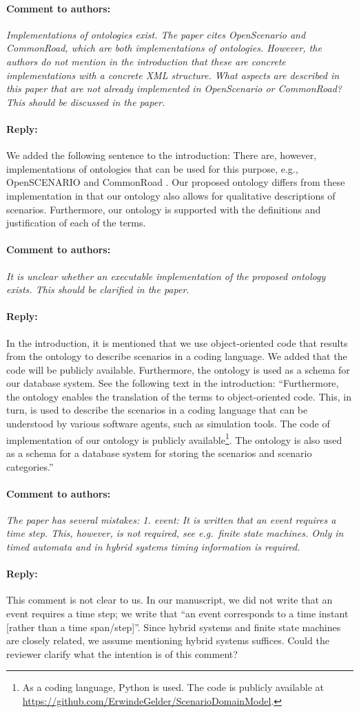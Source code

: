 \documentclass[10pt,final,a4paper,oneside,onecolumn]{article}
\renewcommand{\cite}[1]{\parencite{#1}}
\newcommand{\toauthor}{\paragraph*{Comment to authors:} \itshape}
\newcommand{\fromauthor}{\paragraph*{Reply:} \normalfont}
\newcommand{\cstart}{\cbstart\color{red}}
\newcommand{\cend}{\cbend\color{black}}
\begin{document}
\toauthor Implementations of ontologies exist. The paper cites OpenScenario and CommonRoad, which are both implementations of ontologies. However, the authors do not mention in the introduction that these are concrete implementations with a concrete XML structure. What aspects are described in this paper that are not already implemented in OpenScenario or CommonRoad? This should be discussed in the paper. 

\fromauthor We added the following sentence to the introduction: \cstart There are, however, implementations of ontologies that can be used for this purpose, e.g., OpenSCENARIO \cite{openscenario} and CommonRoad \cite{althoff2017CommonRoad}. Our proposed ontology differs from these implementation in that our ontology also allows for qualitative descriptions of scenarios. Furthermore, our ontology is supported with the definitions and justification of each of the terms.\cend

\toauthor It is unclear whether an executable implementation of the proposed ontology exists. This should be clarified in the paper.

\fromauthor In the introduction, it is mentioned that we use object-oriented code that results from the ontology to describe scenarios in a coding language. We added that the code will be publicly available. Furthermore, the ontology is used as a schema for our database system. See the following text in the introduction: ``Furthermore, the ontology enables the translation of the terms to object-oriented code. This, in turn, is used to describe the scenarios in a coding language that can be understood by various software agents, such as simulation tools. \cstart The code of implementation of our ontology is publicly available\footnote{\cstart As a coding language, Python is used. The code is publicly available at \url{https://github.com/ErwindeGelder/ScenarioDomainModel}.\cend}\cend. The ontology is also used as a schema for a database system for storing the scenarios and scenario categories.''

\toauthor The paper has several mistakes: 1. event: It is written that an event requires a time step. This, however, is not required, see e.g.\ finite state machines. Only in timed automata and in hybrid systems timing information is required.
	
\fromauthor This comment is not clear to us. In our manuscript, we did not write that an event requires a time step; we write that ``an event corresponds to a time instant [rather than a time span/step]''. Since hybrid systems and finite state machines are closely related, we assume mentioning hybrid systems suffices. Could the reviewer clarify what the intention is of this comment?
\end{document}
